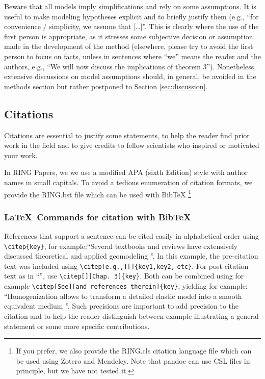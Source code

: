 \documentclass[final]{ring}
\begin{document}
Beware that all models imply simplifications and rely on some assumptions. It is useful to make modeling hypotheses explicit and to briefly justify them (e.g., ``for convenience / simplicity, we assume that […]''. This is clearly where the use of the first person is appropriate, as it stresses some subjective decision or assumption made in the development of the method (elsewhere, please try to avoid the first person to focus on facts, unless in sentences where “we” means the reader and the authors, e.g., “We will now discuss the implications of theorem 3”). Nonetheless, extensive discussions on model assumptions should, in general, be avoided in the methods section but rather postponed to Section \ref{sec:discussion}.

\subsection{Citations}

Citations are essential to justify some statements, to help the reader find prior work in the field and to give credits to fellow scientists who inspired or motivated your work. 

In RING Papers, we we use a modified APA (sixth Edition) style with author names in small capitals. To avoid a tedious enumeration of citation formats, we provide the RING.bst file which can be used with BibTeX \footnote{If you prefer, we also provide the RING.cls citation language file which can be used using Zotero and Mendeley. Note that pandoc can use CSL files in principle, but we have not tested it.}

\subsubsection{\LaTeX\ Commands for citation with BibTeX}

References that support a sentence can be cited easily in alphabetical order using \verb|\citep{key}|, for example:``Several textbooks and reviews have extensively discussed theoretical and applied geomodeling \citep[e.g.,][]{Mallet2002, Mallet2014, Perrin2013, Ringrose2015, Wellmann2018AG}''. In this example, the pre-citation text was included using \verb|\citep[e.g.,][]{key1,key2,| \verb|etc}|. For post-citation text as in ``\citep[chap. 3][]{Mallet2002}'', use \verb|\citep[][Chap. 3]{key}|. Both can be combined using for example \verb|\citep[See][and references therein]{key}|, yielding for example: ``Homogenization allows to transform a detailed elastic model into a smooth equivalent medium \citep[See][and references therein]{Capdeville2020AiG}''. Such precisions are important to add precision to the citation and to help the reader distinguish between example illustrating a general statement or some more specific contributions. 
\end{document}
